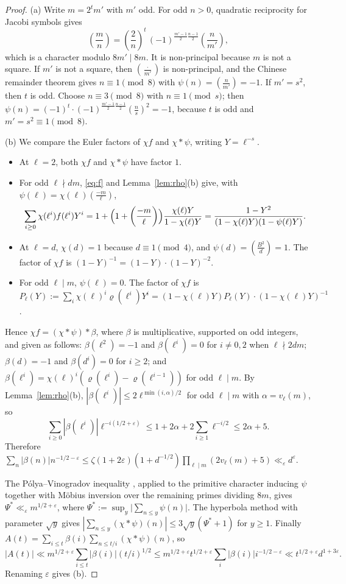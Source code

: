 \documentclass[11pt]{amsart}
\theoremstyle{remark}
\theoremstyle{definition}
\numberwithin{equation}{section}
\newcommand{\eps}{\varepsilon}
\newcommand{\leg}[2]{\left(\frac{#1}{#2}\right)}
\begin{document}
\begin{proof}
(a) Write $m=2^{t}m'$ with $m'$ odd. For odd $n>0$, quadratic reciprocity for Jacobi symbols gives
\[
\leg mn=\leg2n^{t}\,(-1)^{\frac{m'-1}2\frac{n-1}2}\leg n{m'},
\]
which is a character modulo $8m'\mid 8m$. It is non-principal because $m$ is not a square. If $m'$ is not a square, then $\leg{\cdot}{m'}$ is non-principal, and the Chinese remainder theorem gives $n\equiv1\pmod 8$ with $\psi(n)=\leg n{m'}=-1$. If $m'=s^2$, then $t$ is odd. Choose $n\equiv3\pmod 8$ with $n\equiv1\pmod s$; then $\psi(n)=(-1)^{t}\cdot(-1)^{\frac{m'-1}2\frac{n-1}2}\leg ns^2=-1$, because $t$ is odd and $m'=s^2\equiv1\pmod 8$.

(b) We compare the Euler factors of $\chi f$ and $\chi*\psi$, writing $Y=\ell^{-s}$.
\begin{itemize}
\item At $\ell=2$, both $\chi f$ and $\chi*\psi$ have factor $1$.
\item For odd $\ell\nmid dm$, \eqref{eq:f} and Lemma~\ref{lem:rho}(b) give, with $\psi(\ell)=\chi(\ell)\leg{-m}\ell$,
\[
\sum_{i\ge0}\chi(\ell^i)f(\ell^i)Y^i=1+\Bigl(1+\leg{-m}\ell\Bigr)\frac{\chi(\ell)Y}{1-\chi(\ell)Y}=\frac{1-Y^2}{(1-\chi(\ell)Y)(1-\psi(\ell)Y)}.
\]
\item At $\ell=d$, $\chi(d)=1$ because $d\equiv1\pmod 4$, and $\psi(d)=\leg{B^2}d=1$. The factor of $\chi f$ is $(1-Y)^{-1}=(1-Y)\cdot(1-Y)^{-2}$.
\item For odd $\ell\mid m$, $\psi(\ell)=0$. The factor of $\chi f$ is $P_\ell(Y):=\sum_i\chi(\ell)^i\varrho(\ell^i)Y^i=(1-\chi(\ell)Y)P_\ell(Y)\cdot(1-\chi(\ell)Y)^{-1}$.
\end{itemize}
Hence $\chi f=(\chi*\psi)*\beta$, where $\beta$ is multiplicative, supported on odd integers, and given as follows: $\beta(\ell^2)=-1$ and $\beta(\ell^i)=0$ for $i\ne0,2$ when $\ell\nmid 2dm$; $\beta(d)=-1$ and $\beta(d^i)=0$ for $i\ge2$; and $\beta(\ell^i)=\chi(\ell)^i(\varrho(\ell^i)-\varrho(\ell^{i-1}))$ for odd $\ell\mid m$. By Lemma~\ref{lem:rho}(b), $|\beta(\ell^i)|\le 2\ell^{\min(i,\alpha)/2}$ for odd $\ell\mid m$ with $\alpha=v_\ell(m)$, so
\[
\sum_{i\ge0}|\beta(\ell^i)|\ell^{-i(1/2+\eps)}\le1+2\alpha+2\sum_{i\ge1}\ell^{-i/2}\le2\alpha+5 .
\]
Therefore $\sum_n|\beta(n)|n^{-1/2-\eps}\le\zeta(1+2\eps)(1+d^{-1/2})\prod_{\ell\mid m}(2v_\ell(m)+5)\ll_\eps d^{\eps}$.

The P\'olya--Vinogradov inequality \cite[Ch.~23]{Da}, applied to the primitive character inducing $\psi$ together with M\"obius inversion over the remaining primes dividing $8m$, gives $\Psi^*\ll_\eps m^{1/2+\eps}$, where $\Psi^*:=\sup_y\bigl|\sum_{n\le y}\psi(n)\bigr|$. The hyperbola method with parameter $\sqrt y$ gives $|\sum_{n\le y}(\chi*\psi)(n)|\le3\sqrt y(\Psi^*+1)$ for $y\ge1$. Finally $A(t)=\sum_{i\le t}\beta(i)\sum_{n\le t/i}(\chi*\psi)(n)$, so
\[
|A(t)|\ll m^{1/2+\eps}\sum_{i\le t}|\beta(i)|(t/i)^{1/2}\le m^{1/2+\eps}t^{1/2+\eps}\sum_i|\beta(i)|i^{-1/2-\eps}\ll t^{1/2+\eps}d^{1+3\eps}.
\]
Renaming $\eps$ gives (b).


\end{proof}
\end{document}
